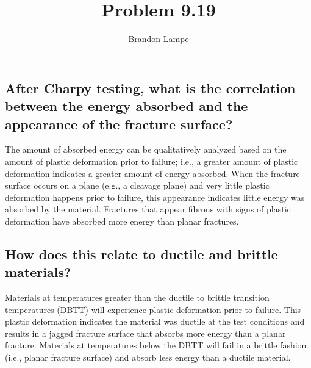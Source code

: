 \documentclass[10pt, letterpaper]{article}
\begin{document}
 
\title{Problem 9.19}
\author{Brandon Lampe}
\maketitle

\subsection{After Charpy testing, what is the correlation between the energy absorbed and the appearance of the fracture surface?}

The amount of absorbed energy can be qualitatively analyzed based on the amount of plastic deformation prior to failure; i.e., a greater amount of plastic deformation indicates a greater amount of energy absorbed.  When the fracture surface occurs on a plane (e.g., a cleavage plane) and very little plastic deformation happens prior to failure, this appearance indicates little energy was absorbed by the material.  Fractures that appear fibrous with signs of plastic deformation have absorbed more energy than planar fractures.

\subsection{How does this relate to ductile and brittle materials?}
Materials at temperatures greater than the ductile to brittle transition temperatures (DBTT) will experience plastic deformation prior to failure.  This plastic deformation indicates the material was ductile at the test conditions and results in a jagged fracture surface that absorbs more energy than a planar fracture.  Materials at temperatures below the DBTT will fail in a brittle fashion (i.e., planar fracture surface) and absorb less energy than a ductile material.
\end{document}
